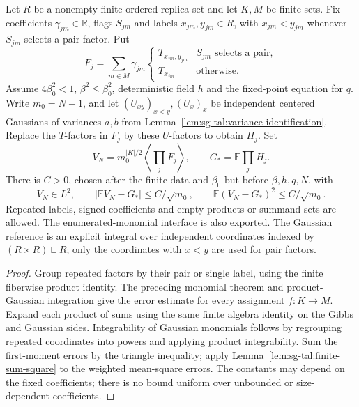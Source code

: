 \begin{theorem}
\label{thm:sg-tal:gibbs-polynomial-moments}
\leanok
{}
Let $R$ be a nonempty finite ordered replica set and let $K,M$ be finite sets.
Fix coefficients $\gamma_{jm}\in\mathbb R$, flags $S_{jm}$ and labels $x_{jm},y_{jm}\in R$,
with $x_{jm}<y_{jm}$ whenever $S_{jm}$ selects a pair factor. Put
\[
 F_j=\sum_{m\in M}\gamma_{jm}
 \begin{cases}T_{x_{jm},y_{jm}}&S_{jm}\text{ selects a pair},\\
 T_{x_{jm}}&\text{otherwise}.
 \end{cases}
\]
Assume $4\beta_0^2<1$, $\beta^2\le\beta_0^2$, deterministic field $h$ and the fixed-point
equation for $q$. Write $m_0=N+1$, and let $(U_{xy})_{x<y},(U_x)_x$ be independent centered
Gaussians of variances $a,b$ from Lemma~\ref{lem:sg-tal:variance-identification}.
Replace the $T$-factors in $F_j$ by these $U$-factors to obtain $H_j$. Set
\[
 V_N=m_0^{|K|/2}\left\langle\prod_jF_j\right\rangle,\qquad
 G_* =\mathbb E\prod_jH_j.
\]
There is $C>0$, chosen after the finite data and $\beta_0$ but before $\beta,h,q,N$, with
\[
 V_N\in L^2,\qquad |\mathbb EV_N-G_*|\le C/\sqrt{m_0},\qquad
 \mathbb E(V_N-G_*)^2\le C/\sqrt{m_0}.
\]
Repeated labels, signed coefficients and empty products or summand sets are allowed.
The enumerated-monomial interface is also exported. The Gaussian reference is an
explicit integral over independent coordinates indexed by $(R\times R)\sqcup R$;
only the coordinates with $x<y$ are used for pair factors.
\end{theorem}
\begin{proof}
\leanok
Group repeated factors by their pair or single label, using the finite fiberwise product
identity. The preceding monomial theorem and product-Gaussian integration give the
error estimate for every assignment $f:K\to M$.
Expand each product of sums using the same finite algebra identity on the Gibbs and
Gaussian sides. Integrability of Gaussian monomials follows by regrouping repeated
coordinates into powers and applying product integrability. Sum the first-moment
errors by the triangle inequality; apply Lemma~\ref{lem:sg-tal:finite-sum-square} to
the weighted mean-square errors. The constants may depend on the fixed coefficients;
there is no bound uniform over unbounded or size-dependent coefficients.
\end{proof}


